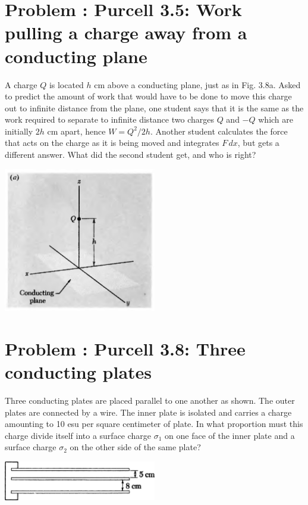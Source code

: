 \documentclass[problems]{esg8022pset}
\renewcommand{\d}{\,d}
\begin{document}
\section{Problem \thesection: Purcell 3.5: Work pulling a charge away from a conducting plane}
  A charge $Q$ is located $h$ cm above a conducting plane, just as
  in Fig. 3.8a. Asked to predict the amount of work that would have
  to be done to move this charge out to infinite distance from the
  plane, one student says that it is the same as the work required to
  separate to infinite distance two charges $Q$ and $-Q$ which are
  initially $2h$ cm apart, hence $W = Q^2 / 2h$. Another student
  calculates the force that acts on the charge as it is being moved
  and integrates $F \d x$, but gets a different answer. What did the
  second student get, and who is right?
  \begin{center}\includegraphics[width=0.5\textwidth]{ps04_03}\end{center}
\section{Problem \thesection: Purcell 3.8: Three conducting plates}
  Three conducting plates are placed parallel to one another as
  shown. The outer plates are connected by a wire. The inner plate
  is isolated and carries a charge amounting to 10 esu per square
  centimeter of plate. In what proportion must this charge divide
  itself into a surface charge $\sigma_1$ on one face of the inner
  plate and a surface charge $\sigma_2$ on the other side of the
  same plate?
  \begin{center}\includegraphics[width=0.5\textwidth]{ps04_04}\end{center}
\end{document}
